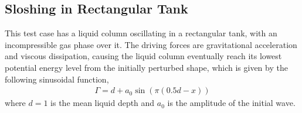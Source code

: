 \documentclass[11pt,a4paper,twoside]{article}
\begin{document}
	
	
	
	\subsection{Sloshing in Rectangular Tank}
	This test case has a liquid column oscillating in a rectangular tank, with an incompressible gas phase over it. The driving forces are gravitational acceleration and viscous dissipation, causing the liquid column eventually reach its lowest potential energy level from the initially perturbed shape, which is  given by the following  sinusoidal function,
	\begin{equation}
	\label{Eq.StandingWaveInterface}
	\begin{aligned}
	\varGamma  = d +a_0\sin\left(\pi (0.5d - x)\right)
	\end{aligned}
	\end{equation}
	where $ d = 1$ is the mean liquid depth and $ a_0 $ is the amplitude of the initial wave.
	
\end{document}
